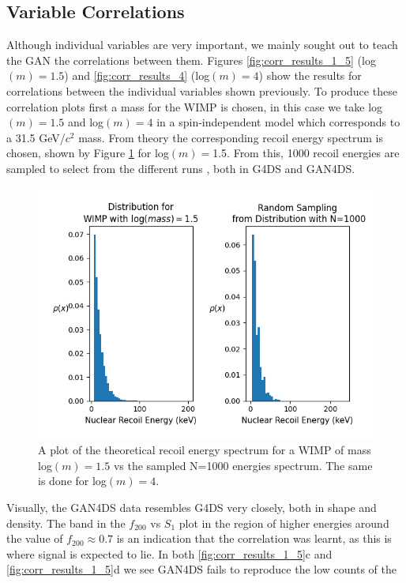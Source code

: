 \documentclass[11pt]{article} %
\begin{document}
\subsection{Variable Correlations}
Although individual variables are very important, we mainly sought out to teach the GAN the correlations between them.
Figures \ref{fig:corr_results_1_5} (log$(m)=1.5$) and \ref{fig:corr_results_4} (log$(m)=4$) show the results for correlations between
the individual variables shown previously.
To produce these correlation plots first a mass for the WIMP is chosen, in this case we take log$(m)=1.5$ and log$(m)=4$ in a spin-independent model which corresponds to a 31.5 GeV/$c^2$ mass.
From theory the corresponding recoil energy spectrum is chosen, shown by Figure \ref{fig:recoil} for log$(m)=$1.5.
From this, 1000 recoil energies are sampled to select from the different runs , both in G4DS and GAN4DS.
\begin{figure}[H]
\centering
\includegraphics[scale=0.6]{images/Ar_c1dat_m1-5.png}
\caption{A plot of the theoretical recoil energy spectrum for a WIMP of mass log$(m)=1.5$ vs the
sampled N=1000 energies spectrum. The same is done for log$(m)=4$.}
\label{fig:recoil}
\end{figure}
Visually, the GAN4DS data resembles G4DS very closely, both in shape and density.
The band in the $f_{200}$ vs $S_1$ plot in the region of higher energies around the value of $f_{200}\approx 0.7$ is an indication that the correlation was
learnt, as this is where signal is expected to lie.
In both \ref{fig:corr_results_1_5}c and \ref{fig:corr_results_1_5}d we see GAN4DS fails to reproduce the low counts of the
\end{document}
